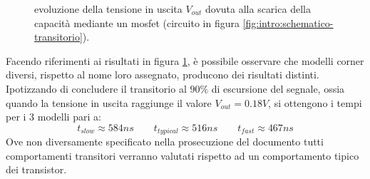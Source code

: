 		\begin{figure}[bht]
			\centering
			
			\caption{evoluzione della tensione in uscita $V_{out}$ dovuta alla scarica della capacità mediante un mosfet (circuito in figura \ref{fig:intro:schematico-transitorio}).}
			\label{fig:intro:nmos-tempitransitorio}
		\end{figure}
	
		Facendo riferimenti ai risultati in figura \ref{fig:intro:nmos-tempitransitorio}, è possibile osservare che modelli corner diversi, rispetto al nome loro assegnato, producono dei risultati distinti. Ipotizzando di concludere il transitorio al $90\%$ di escursione del segnale, ossia quando la tensione in uscita raggiunge il valore $V_{out} = 0.18V$, si ottengono i tempi per i 3 modelli pari a:
		\[ t_{slow} \approx 584 ns \qquad t_{typical} \approx 516 ns \qquad t_{fast} \approx 467ns    \] 
		Ove non diversamente specificato nella prosecuzione del documento tutti comportamenti transitori verranno valutati rispetto ad un comportamento tipico dei transistor.
		
	
	
	
	
	
	
	
